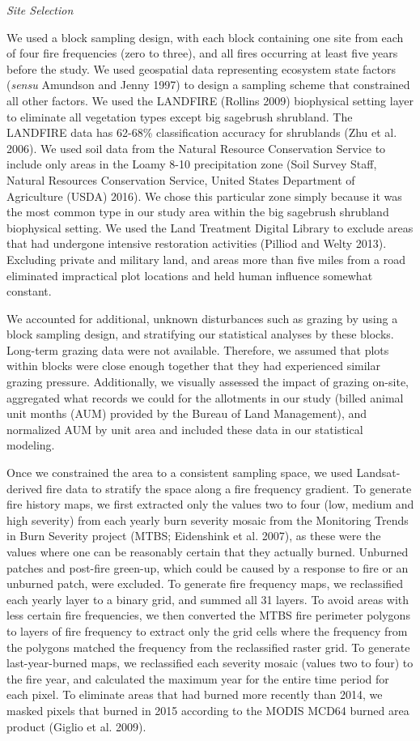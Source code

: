 \documentclass[12pt,]{article}
\begin{document}
\emph{Site Selection}

We used a block sampling design, with each block containing one site
from each of four fire frequencies (zero to three), and all fires
occurring at least five years before the study. We used geospatial data
representing ecosystem state factors (\emph{sensu} Amundson and Jenny
1997) to design a sampling scheme that constrained all other factors. We
used the LANDFIRE (Rollins 2009) biophysical setting layer to eliminate
all vegetation types except big sagebrush shrubland. The LANDFIRE data
has 62-68\% classification accuracy for shrublands (Zhu et al. 2006). We
used soil data from the Natural Resource Conservation Service to include
only areas in the Loamy 8-10 precipitation zone (Soil Survey Staff,
Natural Resources Conservation Service, United States Department of
Agriculture (USDA) 2016). We chose this particular zone simply because
it was the most common type in our study area within the big sagebrush
shrubland biophysical setting. We used the Land Treatment Digital
Library to exclude areas that had undergone intensive restoration
activities (Pilliod and Welty 2013). Excluding private and military
land, and areas more than five miles from a road eliminated impractical
plot locations and held human influence somewhat constant.

We accounted for additional, unknown disturbances such as grazing by
using a block sampling design, and stratifying our statistical analyses
by these blocks. Long-term grazing data were not available. Therefore,
we assumed that plots within blocks were close enough together that they
had experienced similar grazing pressure. Additionally, we visually
assessed the impact of grazing on-site, aggregated what records we could
for the allotments in our study (billed animal unit months (AUM)
provided by the Bureau of Land Management), and normalized AUM by unit
area and included these data in our statistical modeling.

Once we constrained the area to a consistent sampling space, we used
Landsat-derived fire data to stratify the space along a fire frequency
gradient. To generate fire history maps, we first extracted only the
values two to four (low, medium and high severity) from each yearly burn
severity mosaic from the Monitoring Trends in Burn Severity project
(MTBS; Eidenshink et al. 2007), as these were the values where one can
be reasonably certain that they actually burned. Unburned patches and
post-fire green-up, which could be caused by a response to fire or an
unburned patch, were excluded. To generate fire frequency maps, we
reclassified each yearly layer to a binary grid, and summed all 31
layers. To avoid areas with less certain fire frequencies, we then
converted the MTBS fire perimeter polygons to layers of fire frequency
to extract only the grid cells where the frequency from the polygons
matched the frequency from the reclassified raster grid. To generate
last-year-burned maps, we reclassified each severity mosaic (values two
to four) to the fire year, and calculated the maximum year for the
entire time period for each pixel. To eliminate areas that had burned
more recently than 2014, we masked pixels that burned in 2015 according
to the MODIS MCD64 burned area product (Giglio et al. 2009).
\end{document}
